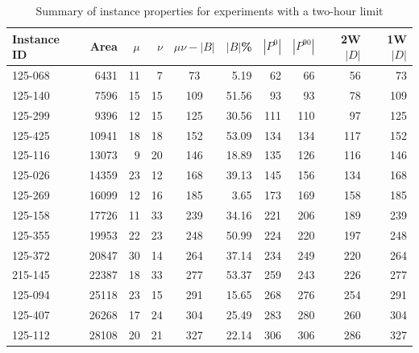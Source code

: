 \documentclass[10pt]{article}
\theoremstyle{definition}
\begin{document}


\begin{table}[H]
\small
  \centering
  \caption{Summary of instance properties for experiments with a two-hour limit}
    \begin{tabular}{lrrrcrrrrr}
    \hline
    \textbf{Instance ID} & \textbf{Area} & \textbf{$\mu$} & \textbf{$\nu$}  & \textbf{$\mu \nu - |B|$} & \textbf{$|B|$\%} & \textbf{$|P^0|$} & \textbf{$|P^{90}|$} & \textbf{2W$|D|$} & \textbf{1W$|D|$} \\
        \hline
125-068  & 6431  & 11    & 7     & 73    & 5.19  & 62    & 66    & 56    & 73 \\
        125-140  & 7596  & 15    & 15    & 109   & 51.56 & 93    & 93    & 78    & 109 \\
        125-299  & 9396  & 12    & 15    & 125   & 30.56 & 111   & 110   & 97    & 125 \\
        125-425  & 10941 & 18    & 18    & 152   & 53.09 & 134   & 134   & 117   & 152 \\
        125-116  & 13073 & 9     & 20    & 146   & 18.89 & 135   & 126   & 116   & 146 \\
        125-026  & 14359 & 23    & 12    & 168   & 39.13 & 145   & 156   & 134   & 168 \\
        125-269  & 16099 & 12    & 16    & 185   & 3.65  & 173   & 169   & 158   & 185 \\
        125-158  & 17726 & 11    & 33    & 239   & 34.16 & 221   & 206   & 189   & 239 \\
        125-355  & 19953 & 22    & 23    & 248   & 50.99 & 224   & 220   & 197   & 248 \\
        125-372  & 20847 & 30    & 14    & 264   & 37.14 & 234   & 249   & 220   & 264 \\
        215-145  & 22387 & 18    & 33    & 277   & 53.37 & 259   & 243   & 226   & 277 \\
        125-094  & 25118 & 23    & 15    & 291   & 15.65 & 268   & 276   & 254   & 291 \\
        125-407  & 26268 & 17    & 24    & 304   & 25.49 & 283   & 280   & 260   & 304 \\
        125-112  & 28108 & 20    & 21    & 327   & 22.14 & 306   & 306   & 286   & 327 \\
    \hline
    \end{tabular}%
  \label{tab:instance_properties}%
\end{table}%
\end{document}
